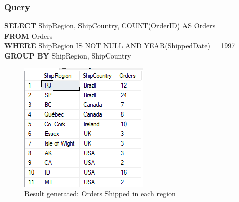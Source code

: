 \documentclass[12pt,a4paper]{report}
\begin{document}
\subsubsection{Query}
\begin{center}
	\begin{minipage}{13cm}
		\textbf{SELECT} ShipRegion, ShipCountry, COUNT(OrderID) AS Orders\\
		\textbf{FROM} Orders\\
		\textbf{WHERE} ShipRegion IS NOT NULL AND YEAR(ShippedDate) = 1997\\
		\textbf{GROUP BY} ShipRegion, ShipCountry
	\end{minipage}
	\begin{figure}[h]
	\centering
		\includegraphics[scale=0.7]{images/14.png}
		\caption{Result generated: Orders Shipped in each region}
	\end{figure}
\end{center}
\end{document}

